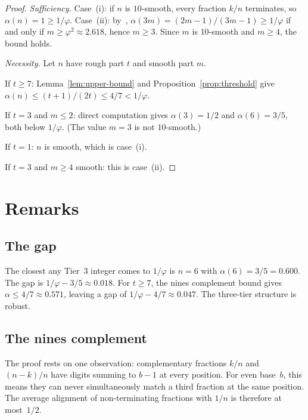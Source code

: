 \documentclass[12pt]{amsart}
\theoremstyle{definition}
\theoremstyle{remark}
\begin{document}
\begin{proof}
\emph{Sufficiency.}
Case~(i): if $n$ is $10$-smooth, every fraction
$k/n$ terminates, so $\alpha(n) = 1 \ge 1/\varphi$.
Case~(ii): by~\cite[Theorem~2]{paper1},
$\alpha(3m) = (2m{-}1)/(3m{-}1) \ge 1/\varphi$ if and only if
$m \ge \varphi^{2} \approx 2.618$, hence $m \ge 3$. Since $m$ is
$10$-smooth and $m \ge 4$, the bound holds.

\medskip
\emph{Necessity.} Let $n$ have rough part $t$ and smooth
part $m$.

If $t \ge 7$: Lemma~\ref{lem:upper-bound} and
Proposition~\ref{prop:threshold} give
$\alpha(n) \le (t{+}1)/(2t) \le 4/7 < 1/\varphi$.

If $t = 3$ and $m \le 2$: direct computation gives
$\alpha(3) = 1/2$ and $\alpha(6) = 3/5$, both below
$1/\varphi$. (The value $m = 3$ is not $10$-smooth.)

If $t = 1$: $n$ is smooth, which is case~(i).

If $t = 3$ and $m \ge 4$ smooth: this is case~(ii).
\end{proof}

\section{Remarks}

\subsection*{The gap}

The closest any Tier~3 integer comes to $1/\varphi$ is
$n = 6$ with $\alpha(6) = 3/5 = 0.600$. The gap is
$1/\varphi - 3/5 \approx 0.018$. For $t \ge 7$, the
nines complement bound gives $\alpha \le 4/7 \approx 0.571$,
leaving a gap of $1/\varphi - 4/7 \approx 0.047$.
The three-tier structure is robust.

\subsection*{The nines complement}

The proof rests on one observation: complementary fractions
$k/n$ and $(n{-}k)/n$ have digits summing to $b{-}1$ at
every position. For even base~$b$, this means they can
never simultaneously match a third fraction at the same
position. The average alignment of non-terminating
fractions with $1/n$ is therefore at most~$1/2$.
\end{document}
